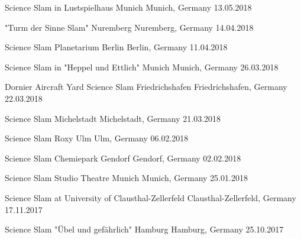 \begin{cvhonors}
\cvhonor
{Science Slam in Lustspielhaus Munich} %
{Munich, Germany} %
{} %
{13.05.2018} %

\cvhonor
{"Turm der Sinne Slam" Nuremberg} %
{Nuremberg, Germany} %
{} %
{14.04.2018} %

\cvhonor
{Science Slam Planetarium Berlin} %
{Berlin, Germany} %
{} %
{11.04.2018} %

\cvhonor
{Science Slam in "Heppel und Ettlich" Munich} %
{Munich, Germany} %
{} %
{26.03.2018} %

\cvhonor
{Dornier Aircraft Yard Science Slam Friedrichshafen} %
{Friedrichshafen, Germany} %
{} %
{22.03.2018} %

\cvhonor
{Science Slam Michelstadt} %
{Michelstadt, Germany} %
{} %
{21.03.2018} %

\cvhonor
{Science Slam Roxy Ulm} %
{Ulm, Germany} %
{} %
{06.02.2018} %

\cvhonor
{Science Slam Chemiepark Gendorf} %
{Gendorf, Germany} %
{} %
{02.02.2018} %

\cvhonor
{Science Slam Studio Theatre Munich} %
{Munich, Germany} %
{} %
{25.01.2018} %

\cvhonor
{Science Slam at University of Clausthal-Zellerfeld} %
{Clausthal-Zellerfeld, Germany} %
{} %
{17.11.2017} %

\cvhonor
{Science Slam "Übel und gefährlich" Hamburg} %
{Hamburg, Germany} %
{} %
{25.10.2017} %


\end{cvhonors}
